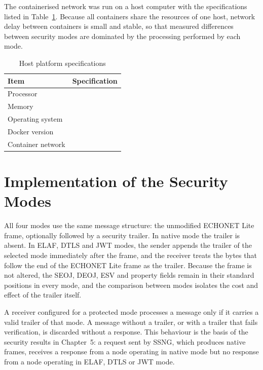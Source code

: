 The containerised network was run on a host computer with the specifications listed in Table~\ref{tab:host}. Because all containers share the resources of one host, network delay between containers is small and stable, so that measured differences between security modes are dominated by the processing performed by each mode.

\begin{table}[htbp]
  \centering
  \caption{Host platform specifications}
  \label{tab:host}
  \renewcommand{\arraystretch}{1.2}
  \begin{tabularx}{\textwidth}{@{}l X@{}}
    \toprule
    \textbf{Item}        & \textbf{Specification} \\
    \midrule
    Processor            & \tbd{}                 \\
    Memory               & \tbd{}                 \\
    Operating system     & \tbd{}                 \\
    Docker version       & \tbd{}                 \\
    Container network    & \tbd{}                 \\
    \bottomrule
  \end{tabularx}
\end{table}

\section{Implementation of the Security Modes}
\label{sec:i-modes}

All four modes use the same message structure: the unmodified ECHONET Lite frame, optionally followed by a security trailer. In native mode the trailer is absent. In ELAF, DTLS and JWT modes, the sender appends the trailer of the selected mode immediately after the frame, and the receiver treats the bytes that follow the end of the ECHONET Lite frame as the trailer. Because the frame is not altered, the SEOJ, DEOJ, ESV and property fields remain in their standard positions in every mode, and the comparison between modes isolates the cost and effect of the trailer itself.

A receiver configured for a protected mode processes a message only if it carries a valid trailer of that mode. A message without a trailer, or with a trailer that fails verification, is discarded without a response. This behaviour is the basis of the security results in Chapter~5: a request sent by SSNG, which produces native frames, receives a response from a node operating in native mode but no response from a node operating in ELAF, DTLS or JWT mode.

